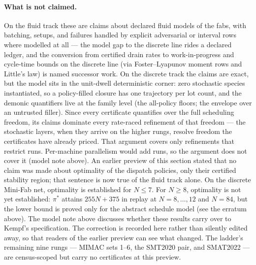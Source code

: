 \paragraph{What is not claimed.} On the fluid track these are claims
about declared fluid models of the fabs, with batching, setups, and
failures handled by explicit adversarial or interval rows where
modelled at all --- the model gap to the discrete line rides a
declared ledger, and the conversion from certified drain rates to
work-in-progress and cycle-time bounds on the discrete line (via
Foster--Lyapunov moment rows and Little's law) is named successor
work. On the discrete track the claims are exact, but the model sits
in the unit-dwell deterministic corner: zero stochastic
species instantiated, so a policy-filled closure has one trajectory
per lot count, and the demonic quantifiers live at the family level
(the all-policy floors; the envelope over an untrusted filler).
Since every certificate quantifies over the full scheduling freedom,
its claims dominate every rate-raced refinement of that freedom ---
the stochastic layers, when they arrive on the higher rungs, resolve
freedom the certificates have already priced. That argument covers
only refinements that restrict runs. Per-machine parallelism would add
runs, so the argument does not cover it (model note above). An
earlier preview of
this section stated that no claim was made about optimality of the
dispatch policies, only their certified stability region; that
sentence is now true of the fluid track alone. On the discrete
Mini-Fab net, optimality is established for $N \le 7$. For $N \ge 8$,
optimality is not yet established: $\pi^\ast$ attains $255N + 375$ in
replay at $N = 8, \ldots, 12$ and $N = 84$, but the lower bound is
proved only for the abstract schedule model (see the erratum above).
The model note above discusses whether these results carry over to
Kempf's specification. The
correction is recorded here rather than silently edited away, so that
readers of the earlier preview can see what changed. The ladder's remaining nine rungs
--- MIMAC sets 1--6, the SMT2020 pair, and SMAT2022 --- are
census-scoped but carry no certificates at this preview.
